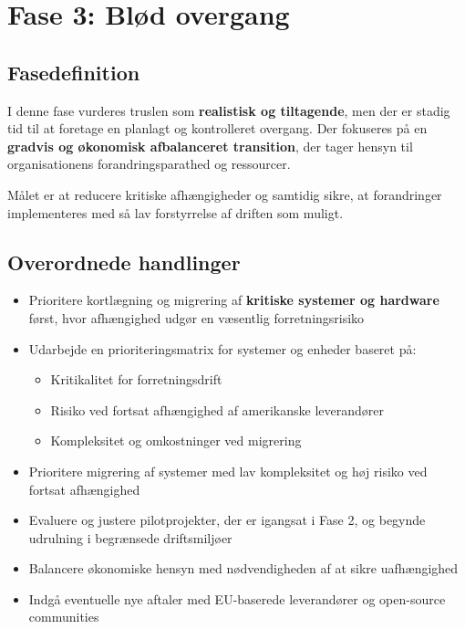 \documentclass[a4paper,11pt,oneside]{book}
\def\tightlist{}
\begin{document}
\newpage

\chapter{Fase 3: Blød overgang}\label{fase-3-bluxf8d-overgang}

\section{Fasedefinition}\label{fasedefinition}

I denne fase vurderes truslen som \textbf{realistisk og tiltagende}, men
der er stadig tid til at foretage en planlagt og kontrolleret overgang.
Der fokuseres på en \textbf{gradvis og økonomisk afbalanceret
transition}, der tager hensyn til organisationens forandringsparathed og
ressourcer.

Målet er at reducere kritiske afhængigheder og samtidig sikre, at
forandringer implementeres med så lav forstyrrelse af driften som
muligt.

\section{Overordnede handlinger}\label{overordnede-handlinger}

\begin{itemize}
\item
  Prioritere kortlægning og migrering af \textbf{kritiske systemer og
  hardware} først, hvor afhængighed udgør en væsentlig forretningsrisiko
\item
  Udarbejde en prioriteringsmatrix for systemer og enheder baseret på:

  \begin{itemize}
  \tightlist
  \item
    Kritikalitet for forretningsdrift
  \item
    Risiko ved fortsat afhængighed af amerikanske leverandører
  \item
    Kompleksitet og omkostninger ved migrering
  \end{itemize}
\item
  Prioritere migrering af systemer med lav kompleksitet og høj risiko
  ved fortsat afhængighed
\item
  Evaluere og justere pilotprojekter, der er igangsat i Fase 2, og
  begynde udrulning i begrænsede driftsmiljøer
\item
  Balancere økonomiske hensyn med nødvendigheden af at sikre
  uafhængighed
\item
  Indgå eventuelle nye aftaler med EU-baserede leverandører og
  open-source communities
\end{itemize}
\end{document}
